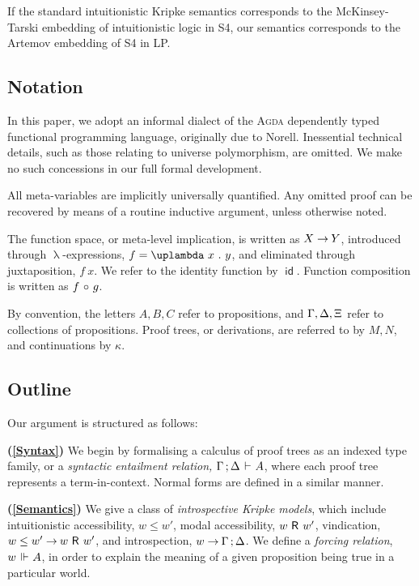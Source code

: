 \documentclass[submission,copyright,creativecommons,sharealike,backref=page]{eptcs}
\newcommand{\Xis}{\rlap{$\Xi$}\hphantom{A}}
\newcommand{\R}{\mathrel{\rlap{$\mkern.75mu\textsf{R}$}\hphantom{\subseteq}}}
\renewcommand{\:}{\mathop{\mkern3mu:\mkern3mu}}
\renewcommand{\.}{\mathop{\mkern3mu.\mkern3mu}}
\renewcommand{\;}{\mathop{;}}
\renewcommand{\,}{\mathop{,}}
\renewcommand{\o}{\mathop{\mkern3mu\circ\mkern3mu}}
\newcommand{\id}{\operatorname{\textsf{id}}}
\newcommand{\e}{\mathrel{\mkern2mu\vdash\mkern1mu}}
\newcommand{\ee}{\mathrel{\mkern2mu\Vdash\mkern1mu}}
\renewcommand{\r}{\mathrel{\rightarrow\mkern-1mu}}
\theoremstyle{mystyle}
\begin{document}
If the standard intuitionistic Kripke semantics corresponds to the McKinsey-Tarski\cite{McKinseyT48} embedding of intuitionistic logic in S4, our semantics corresponds to the Artemov embedding of S4 in LP.


\subsection*{Notation}

In this paper, we adopt an informal dialect of the \textsc{Agda} dependently typed functional programming language, originally due to Norell\cite{Norell07}.  Inessential technical details, such as those relating to universe polymorphism, are omitted.  We make no such concessions in our full formal development.

All meta-variables are implicitly universally quantified.  Any omitted proof can be recovered by means of a routine inductive argument, unless otherwise noted.  

The function space, or meta-level implication, is written as $X \r Y$, introduced through $\uplambda$-expressions, $f = \uplambda~x \. y$, and eliminated through juxtaposition, $f~x$.  We refer to the identity function by $\id$.  Function composition is written as $f \o g$.

By convention, the letters $A, B, C$ refer to propositions, and $\Gamma, \Delta, \Xis$ refer to collections of propositions.  Proof trees, or derivations, are referred to by $M, N$, and continuations by $\kappa$.


\subsection*{Outline}

Our argument is structured as follows:

\textbf{(\ref{Syntax})} We begin by formalising a calculus of proof trees as an indexed type family, or a \emph{syntactic entailment relation,} $\Gamma \; \Delta \e A$, where each proof tree represents a term-in-context.  Normal forms are defined in a similar manner.

\textbf{(\ref{Semantics})} We give a class of \emph{introspective Kripke models}, which include intuitionistic accessibility, $w \le w'$, modal accessibility, $w \R w'$, vindication, $w \le w' \r w \R w'$, and introspection, $w \r \Gamma \; \Delta$.  We define a \emph{forcing relation}, $w \ee A$, in order to explain the meaning of a given proposition being true in a particular world.
\end{document}
